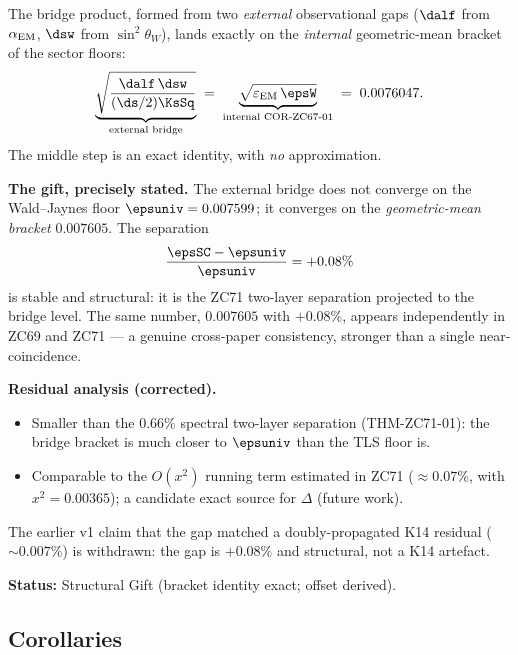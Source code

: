 \documentclass[12pt, a4paper]{article}
\renewcommand{\epsEM}{\varepsilon_{\rm EM}}
\renewcommand{\swsq}{\sin^2\!\theta_W}
\renewcommand{\aEM}{\alpha_{\rm EM}}
\begin{document}
\begin{giftbox}[title={FIND-ZC68-02: Bridge Bracket Identity (Gift)}]
The bridge product, formed from two \emph{external} observational gaps
($\dalf$ from $\aEM$, $\dsw$ from $\swsq$), lands exactly on the
\emph{internal} geometric-mean bracket of the sector floors:
\[
  \underbrace{\sqrt{\frac{\dalf\,\dsw}{(\ds/2)\KsSq}}}_{\text{external bridge}}
  \;=\;
  \underbrace{\sqrt{\epsEM\,\epsW}}_{\text{internal COR-ZC67-01}}
  \;=\;0.0076047.
\]
The middle step is an exact identity, with \emph{no} approximation.

\textbf{The gift, precisely stated.}
The external bridge does not converge on the Wald--Jaynes floor
$\epsuniv=0.007599$; it converges on the \emph{geometric-mean bracket}
$0.007605$. The separation
\[
  \frac{\epsSC-\epsuniv}{\epsuniv}=+0.08\%
\]
is stable and structural: it is the ZC71 two-layer separation projected
to the bridge level. The same number, $0.007605$ with $+0.08\%$, appears
independently in ZC69 and ZC71 --- a genuine cross-paper consistency,
stronger than a single near-coincidence.

\textbf{Residual analysis (corrected).}
\begin{itemize}[leftmargin=2em,noitemsep]
  \item Smaller than the $0.66\%$ spectral two-layer separation
    (THM-ZC71-01): the bridge bracket is much closer to $\epsuniv$ than
    the TLS floor is.
  \item Comparable to the $O(x^2)$ running term estimated in ZC71
    ($\approx 0.07\%$, with $x^2=0.00365$); a candidate exact source for
    $\Delta$ (future work).
\end{itemize}
The earlier v1 claim that the gap matched a doubly-propagated K14
residual ($\sim 0.007\%$) is withdrawn: the gap is $+0.08\%$ and
structural, not a K14 artefact.

\textbf{Status:} Structural Gift (bracket identity exact; offset derived).
\end{giftbox}

\subsection{Corollaries}
\label{sec:cor}

\end{document}
